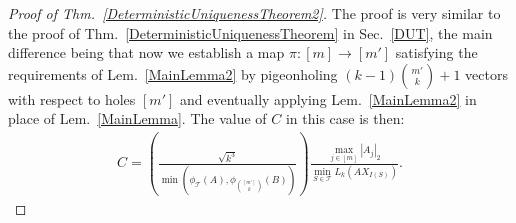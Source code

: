 \documentclass[journal, twocolumn]{IEEEtran}
\newtheorem{theorem}{Theorem}
\newtheorem{lemma}{Lemma}
\begin{document}
\begin{proof}[Proof of Thm.~\ref{DeterministicUniquenessTheorem2}]
The proof is very similar to the proof of Thm.~\ref{DeterministicUniquenessTheorem} in Sec.~\ref{DUT}, the main difference being that now we establish a map $\pi: [m] \to [m']$ satisfying the requirements of Lem.~\ref{MainLemma2} by pigeonholing $(k-1){m' \choose k} + 1$ vectors with respect to holes $[m']$ and eventually applying Lem.~\ref{MainLemma2} in place of Lem.~\ref{MainLemma}. The value of $C$ in this case is then:
\begin{align}\label{Cdef2}
C= \left( \frac{ \sqrt{k^3}}{ \min(\phi_\mathcal{T}(A), \phi_{{[m'] \choose k}}(B)) } \right) \frac{\max_{j \in [m]} |A_j|_2}{\min_{S \in \mathcal{T}} L_k(AX_{I(S)})}.
\end{align}
%
\end{proof}





\end{document}

